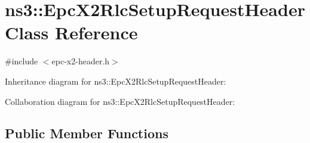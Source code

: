 \hypertarget{classns3_1_1EpcX2RlcSetupRequestHeader}{}\section{ns3\+:\+:Epc\+X2\+Rlc\+Setup\+Request\+Header Class Reference}
\label{classns3_1_1EpcX2RlcSetupRequestHeader}


{\ttfamily \#include $<$epc-\/x2-\/header.\+h$>$}



Inheritance diagram for ns3\+:\+:Epc\+X2\+Rlc\+Setup\+Request\+Header\+:


Collaboration diagram for ns3\+:\+:Epc\+X2\+Rlc\+Setup\+Request\+Header\+:
\subsection*{Public Member Functions}
